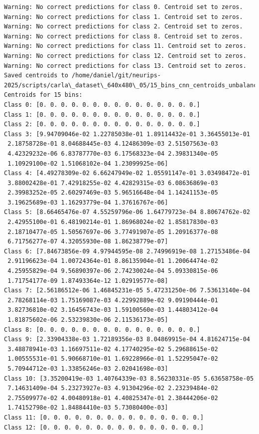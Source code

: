\begin{verbatim}
Warning: No correct predictions for class 0. Centroid set to zeros.
Warning: No correct predictions for class 1. Centroid set to zeros.
Warning: No correct predictions for class 2. Centroid set to zeros.
Warning: No correct predictions for class 8. Centroid set to zeros.
Warning: No correct predictions for class 11. Centroid set to zeros.
Warning: No correct predictions for class 12. Centroid set to zeros.
Warning: No correct predictions for class 13. Centroid set to zeros.
Saved centroids to /home/daniel/git/neurips-2025/scripts/carla\_dataset\_640x480\_05/15_bins_cnn_centroids_unbalanced.npy
Centroids for 15 bins:
Class 0: [0. 0. 0. 0. 0. 0. 0. 0. 0. 0. 0. 0. 0. 0. 0.]
Class 1: [0. 0. 0. 0. 0. 0. 0. 0. 0. 0. 0. 0. 0. 0. 0.]
Class 2: [0. 0. 0. 0. 0. 0. 0. 0. 0. 0. 0. 0. 0. 0. 0.]
Class 3: [9.94709046e-02 1.22785038e-01 1.89114432e-01 3.36455013e-01
 2.18758728e-01 8.04688445e-03 4.12486309e-03 2.51507563e-03
 4.42329232e-06 6.83787770e-03 6.17568323e-04 2.39831340e-05
 1.10929100e-02 1.51068102e-04 1.23099925e-06]
Class 4: [4.49278309e-02 6.66247949e-02 1.05591147e-01 3.03498472e-01
 3.88002428e-01 7.42918255e-02 4.42829315e-03 6.08636869e-03
 2.39983252e-05 2.60297469e-03 5.96516648e-04 1.14241153e-05
 3.19625689e-03 1.16293779e-04 1.37616767e-06]
Class 5: [8.66465476e-07 4.55259796e-06 1.64779723e-04 8.80674762e-02
 2.42955100e-01 6.48190214e-01 1.86968024e-02 1.85817830e-03
 2.18710477e-05 1.50567697e-06 3.77491907e-05 1.20916377e-08
 6.71756277e-07 4.32055930e-08 1.86238779e-07]
Class 6: [7.84673856e-09 4.97944595e-08 2.74996919e-08 1.27153486e-04
 2.91196623e-04 1.00724364e-01 8.86135904e-01 1.20064474e-02
 4.25955829e-04 9.56890397e-06 2.74230024e-04 5.09330815e-06
 1.71754177e-09 1.87493364e-12 1.02919577e-08]
Class 7: [2.56186512e-06 1.46845231e-05 5.47231250e-06 7.53613140e-04
 2.78268114e-03 1.75169087e-03 4.22992889e-02 9.09190444e-01
 3.82736810e-02 3.16456743e-03 1.59100560e-03 1.44803412e-04
 1.81875602e-06 2.53239830e-06 2.11536173e-05]
Class 8: [0. 0. 0. 0. 0. 0. 0. 0. 0. 0. 0. 0. 0. 0. 0.]
Class 9: [2.33904338e-03 1.72189356e-03 8.04869915e-04 4.81624715e-04
 3.48878941e-03 1.16697511e-02 4.17740295e-02 5.29688615e-02
 1.00555531e-01 5.90668710e-01 1.69228966e-01 1.52295047e-02
 5.70944712e-03 1.33856246e-03 2.02041698e-03]
Class 10: [3.35200419e-03 1.40764339e-03 8.56230331e-05 5.63658758e-05
 7.14631409e-04 5.23273927e-03 4.91304296e-02 2.23239484e-02
 2.75509977e-02 4.00480918e-01 4.40825347e-01 2.38444206e-02
 1.74152798e-02 1.84884410e-03 5.73080400e-03]
Class 11: [0. 0. 0. 0. 0. 0. 0. 0. 0. 0. 0. 0. 0. 0. 0.]
Class 12: [0. 0. 0. 0. 0. 0. 0. 0. 0. 0. 0. 0. 0. 0. 0.]

\end{verbatim}
